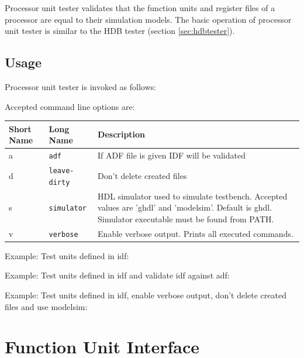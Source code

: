 \documentclass[a4paper,twoside]{tceusermanual}
\begin{document}
Processor unit tester validates that the function units and register files of
a processor are equal to their simulation models. The basic operation of processor
unit tester is similar to the HDB tester (section \ref{sec:hdbtester}).

\subsection{Usage}

Processor unit tester is invoked as follows:


Accepted command line options are:

\begin{center}
\begin{longtable}[htb]{@{}p{}@{}p{}%
                     @{}p{}}

\textbf{Short Name} &\textbf{Long Name} &\textbf{Description} \\
\hline

a & \verb|adf| &
If ADF file is given IDF will be validated \\

d & \verb|leave-dirty| &
Don't delete created files \\

s & \verb|simulator| &
HDL simulator used to simulate testbench. Accepted values are 'ghdl' and
'modelsim'. Default is ghdl. Simulator executable must be found from PATH. \\

v & \verb|verbose| &
Enable verbose output. Prints all executed commands. \\

\end{longtable}
\end{center}

Example: Test units defined in idf:


Example: Test units defined in idf and validate idf against adf:


Example: Test units defined in idf, enable verbose output, don't delete created
files and use modelsim:



\section{Function Unit Interface}
\end{document}
